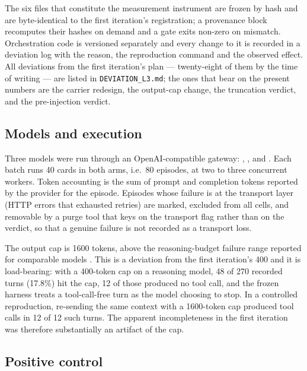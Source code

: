 \documentclass[11pt]{article}
\begin{document}
\begin{sloppypar}
The six files that constitute the measurement instrument are frozen by hash and are byte-identical to the first iteration's registration; a provenance block recomputes their hashes on demand and a gate exits non-zero on mismatch. Orchestration code is versioned separately and every change to it is recorded in a deviation log with the reason, the reproduction command and the observed effect. All deviations from the first iteration's plan --- twenty-eight of them by the time of writing --- are listed in \texttt{DEVIATION\_L3.md}; the ones that bear on the present numbers are the carrier redesign, the output-cap change, the truncation verdict, and the pre-injection verdict.

\subsection{Models and execution}

Three models were run through an OpenAI-compatible gateway:\newline
\noindent{}, , and . Each batch runs 40 cards in both arms, i.e.\ 80 episodes, at two to three concurrent workers. Token accounting is the sum of prompt and completion tokens reported by the provider for the episode. Episodes whose failure is at the transport layer (HTTP errors that exhausted retries) are marked, excluded from all cells, and removable by a purge tool that keys on the transport flag rather than on the verdict, so that a genuine failure is not recorded as a transport loss.


The output cap is 1600 tokens, above the reasoning-budget failure range reported for comparable models \cite{pu2025thoughtterminator,huang2025adactrl}. This is a deviation from the first iteration's 400 and it is load-bearing: with a 400-token cap on a reasoning model, 48 of 270 recorded turns (17.8\%) hit the cap, 12 of those produced no tool call, and the frozen harness treats a tool-call-free turn as the model choosing to stop. In a controlled reproduction, re-sending the same context with a 1600-token cap produced tool calls in 12 of 12 such turns. The apparent incompleteness in the first iteration was therefore substantially an artifact of the cap.

\subsection{Positive control}


\end{sloppypar}
\end{document}
